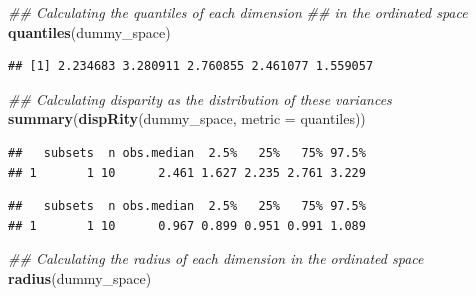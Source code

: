 \documentclass[]{book}
\newenvironment{Shaded}{\begin{snugshade}}{\end{snugshade}}
\newcommand{\CommentTok}[1]{\textcolor[rgb]{0.56,0.35,0.01}{\textit{#1}}}
\newcommand{\DataTypeTok}[1]{\textcolor[rgb]{0.13,0.29,0.53}{#1}}
\newcommand{\DecValTok}[1]{\textcolor[rgb]{0.00,0.00,0.81}{#1}}
\newcommand{\KeywordTok}[1]{\textcolor[rgb]{0.13,0.29,0.53}{\textbf{#1}}}
\newcommand{\NormalTok}[1]{#1}
\begin{document}
\begin{Shaded}
\begin{Highlighting}[]
\CommentTok{## Calculating the quantiles of each dimension}
\CommentTok{## in the ordinated space}
\KeywordTok{quantiles}\NormalTok{(dummy_space)}
\end{Highlighting}
\end{Shaded}

\begin{verbatim}
## [1] 2.234683 3.280911 2.760855 2.461077 1.559057
\end{verbatim}

\begin{Shaded}
\begin{Highlighting}[]
\CommentTok{## Calculating disparity as the distribution of these variances}
\KeywordTok{summary}\NormalTok{(}\KeywordTok{dispRity}\NormalTok{(dummy_space, }\DataTypeTok{metric =}\NormalTok{ quantiles))}
\end{Highlighting}
\end{Shaded}

\begin{verbatim}
##   subsets  n obs.median  2.5%   25%   75% 97.5%
## 1       1 10      2.461 1.627 2.235 2.761 3.229
\end{verbatim}

\begin{Shaded}
\end{Shaded}

\begin{verbatim}
##   subsets  n obs.median  2.5%   25%   75% 97.5%
## 1       1 10      0.967 0.899 0.951 0.991 1.089
\end{verbatim}

\begin{Shaded}
\begin{Highlighting}[]
\CommentTok{## Calculating the radius of each dimension in the ordinated space}
\KeywordTok{radius}\NormalTok{(dummy_space)}
\end{Highlighting}
\end{Shaded}
\end{document}
